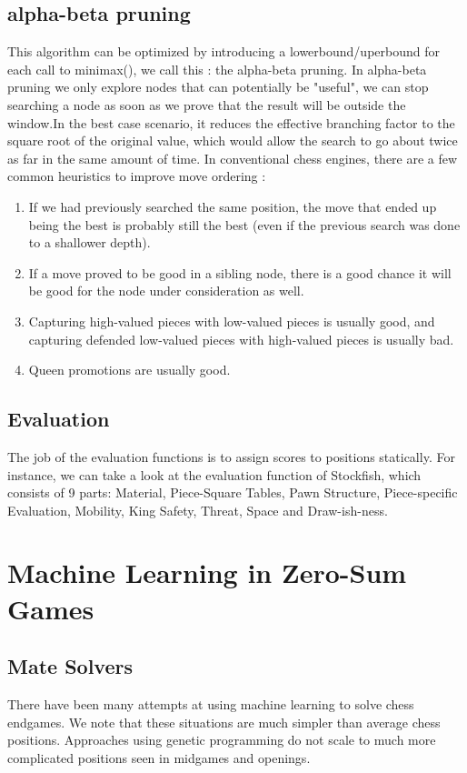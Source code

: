 \documentclass[12pt, a4paper]{report}
\begin{document}
		\section{alpha-beta pruning}
		This algorithm can be optimized by introducing a lowerbound/uperbound for each call to minimax(), we call this : the alpha-beta pruning.
		In alpha-beta pruning we only explore nodes that can potentially be "useful", we can stop searching a node as soon as we prove that the result will be outside the window.In the best case scenario, it reduces the effective branching factor to the square root of the original value, which would allow the search to go about twice as far in the same amount of time.
		In conventional chess engines, there are a few common heuristics to improve move ordering :
			\begin{enumerate}
				\item If we had previously searched the same position, the move that ended up being the best is probably still the best (even if the previous search was done to a shallower depth).
				\item If a move proved to be good in a sibling node, there is a good chance it will be good for the node under consideration as well.
				\item Capturing high-valued pieces with low-valued pieces is usually good, and capturing defended low-valued pieces with high-valued pieces is usually bad.
				\item Queen promotions are usually good.
			\end{enumerate}
		\section{Evaluation}
		The job of the evaluation functions is to assign scores to positions statically.
		For instance, we can take a look at the evaluation function of Stockfish, which consists of 9 parts: Material, Piece-Square Tables, Pawn Structure, Piece-specific Evaluation, Mobility, King Safety, Threat, Space and Draw-ish-ness.
	
	\chapter{Machine Learning in Zero-Sum Games}
	\section{Mate Solvers}
	There have been many attempts at using machine learning to solve chess endgames.
	We note that these situations are much simpler than average chess positions. Approaches using genetic programming do not scale to much more complicated positions seen in midgames and openings.	
\end{document}
